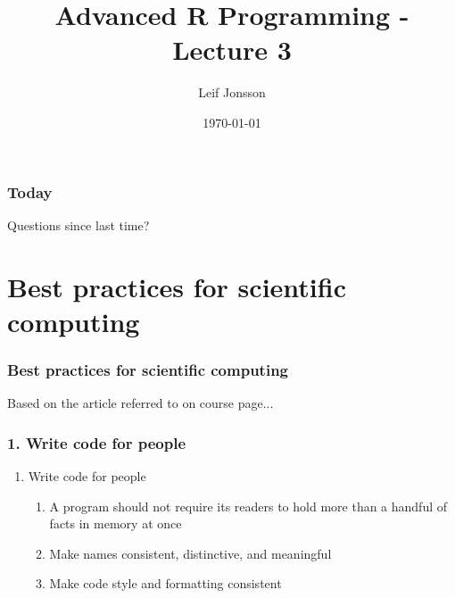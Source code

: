 \documentclass{beamer}
\title[Lecture 1]{Advanced R Programming - Lecture 3} %
\author{Leif Jonsson} %
\institute[STIMA LiU] %
{
Link\"{o}ping University \\ %
\medskip
\textit{leif.jonsson@ericsson.com\\leif.r.jonsson@liu.se} %
}
\date{\today} %
\begin{document}
\begin{frame}
\titlepage %
\end{frame}

\begin{frame}
\frametitle{Today} %
\tableofcontents %
\end{frame}


\begin{frame}
	\Huge{\centerline{Questions since last time?}}
\end{frame}

\section{Best practices	for scientific computing} 

\begin{frame}
\frametitle{Best practices	for scientific computing}
Based on the article referred to on course page...
\end{frame}

\begin{frame}
	\frametitle{1. Write code for people}
	\begin{enumerate}
		\item Write code for people
		\begin{enumerate}
			\item A program should not require its readers to hold more than a 
			handful of facts in memory at once
			\item Make names consistent, distinctive, and meaningful
			\item Make code style and formatting consistent
		\end{enumerate}
	\end{enumerate}		
\end{frame}
\end{document}
